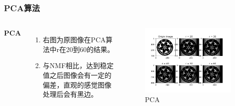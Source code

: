 \documentclass[UTF8,mathserif]{beamer}
\begin{document}
\begin{frame}
\frametitle{PCA算法}

\begin{columns}[c] %
	
	\textbf{PCA}
	\begin{enumerate}
		\item 右图为原图像在PCA算法中r在20到60的结果。
		\item 与NMF相比，达到稳定值之后图像会有一定的偏差，直观的感觉图像处理后会有黑边。
	\end{enumerate}
	
	\begin{figure}[h]%
		\centering  %
		\includegraphics[width=1.2\linewidth]{image/Analyse_PCA}  %
		\caption{PCA}  %
		\label{fig:mcmthesis-logo}   %
	\end{figure}
	
	
\end{columns}
\end{frame}
\end{document}
